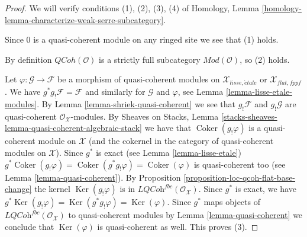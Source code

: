 \documentclass[10pt,a4paper]{amsart}
\theoremstyle{plain}
\theoremstyle{definition}
\theoremstyle{remark}
\numberwithin{equation}{subsection}
\def\etale{{\acute{e}tale}}
\def\QCoh{\mathit{QCoh}}
\def\Ker{\mathop{\mathrm{Ker}}}
\def\Coker{\mathop{\mathrm{Coker}}}
\begin{document}
\begin{proof}
We will verify conditions (1), (2), (3), (4) of
Homology, Lemma \ref{homology-lemma-characterize-weak-serre-subcategory}.

\medskip\noindent
Since $0$ is a quasi-coherent module on any ringed site we see that (1)
holds.

\medskip\noindent
By definition $\QCoh(\mathcal{O})$
is a strictly full subcategory $\textit{Mod}(\mathcal{O})$, so (2) holds.

\medskip\noindent
Let $\varphi : \mathcal{G} \to \mathcal{F}$ be a morphism of quasi-coherent
modules on $\mathcal{X}_{lisse,\etale}$ or $\mathcal{X}_{flat,fppf}$.
We have $g^*g_!\mathcal{F} = \mathcal{F}$ and similarly for
$\mathcal{G}$ and $\varphi$, see Lemma \ref{lemma-lisse-etale-modules}.
By Lemma \ref{lemma-shriek-quasi-coherent}
we see that $g_!\mathcal{F}$ and $g_!\mathcal{G}$ are quasi-coherent
$\mathcal{O}_\mathcal{X}$-modules. By Sheaves on Stacks, Lemma
\ref{stacks-sheaves-lemma-quasi-coherent-algebraic-stack}
we have that $\Coker(g_!\varphi)$ is a quasi-coherent
module on $\mathcal{X}$ (and the cokernel in the category
of quasi-coherent modules on $\mathcal{X}$).
Since $g^*$ is exact (see Lemma \ref{lemma-lisse-etale})
$g^*\Coker(g_!\varphi) = \Coker(g^*g_!\varphi) = \Coker(\varphi)$
is quasi-coherent too (see Lemma \ref{lemma-quasi-coherent}).
By Proposition \ref{proposition-loc-qcoh-flat-base-change}
the kernel $\Ker(g_!\varphi)$ is in
$\textit{LQCoh}^{fbc}(\mathcal{O}_\mathcal{X})$.
Since $g^*$ is exact, we have
$g^*\Ker(g_!\varphi) = \Ker(g^*g_!\varphi) = \Ker(\varphi)$.
Since $g^*$ maps objects of
$\textit{LQCoh}^{fbc}(\mathcal{O}_\mathcal{X})$ to quasi-coherent
modules by Lemma \ref{lemma-quasi-coherent} we conclude that
$\Ker(\varphi)$ is quasi-coherent as well. This proves (3).


\end{proof}
\end{document}

